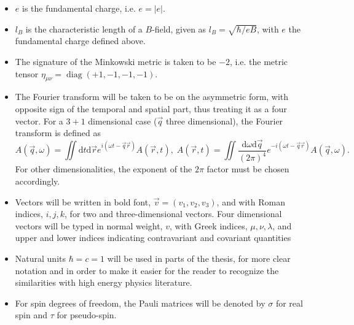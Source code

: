 \begin{itemize}
\item $e$ is the fundamental charge, i.e. $e = |e|$.
\item $l_B$ is the characteristic length of a $B$-field, given as $l_B= \sqrt{\hbar /eB}$, with $e$ the fundamental charge defined above.
\item The signature of the Minkowski metric is taken to be $-2$, i.e. the metric tensor $\eta _{\mu \nu } = \operatorname{diag} (+1, -1,-1,-1)$.
\item The Fourier transform will be taken to be on the asymmetric form, with opposite sign of the temporal and spatial part, thus treating it as a four vector.
  For a $3+1$ dimensional case ($\vec{q}$ three dimensional), the Fourier transform is defined as
  \begin{equation}
    \label{eq:define-fourier}
    A(\vec{q}, \omega )\! =\!\!
    \iint \mathrm{d}t \mathrm{d} \vec{r}
    e^{i(\omega  t - \vec{q} \vec{r} )}
    A(\vec{r}, t),
    \;
    A(\vec{r}, t) =\!\!
    \iint 
    \frac{\mathrm{d}\omega  \mathrm{d} \vec{q}}{(2\pi )^4}
    e^{-i(\omega  t - \vec{q} \vec{r} )}
    A(\vec{q}, \omega).
  \end{equation}
  For other dimensionalities, the exponent of the $2\pi $ factor must be chosen accordingly.

\item Vectors will be written in bold font, $\vec{v} = (v_1, v_2, v_3)$, and with Roman indices, $i, j, k$, for two and three-dimensional vectors.
  Four dimensional vectors will be typed in normal weight, $v$, with Greek indices, $\mu ,  \nu , \lambda $, and upper and lower indices indicating contravariant and covariant quantities
\item Natural units \( \hbar = c = 1 \) will be used in parts of the thesis, for more clear notation and in order to make it easier for the reader to recognize the similarities with high energy physics literature.
\item For spin degrees of freedom, the Pauli matrices
  will be denoted by $\sigma $ for real spin and $\tau $ for pseudo-spin.
  

\end{itemize}
